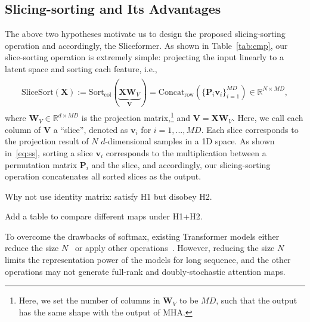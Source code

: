 \subsection{Slicing-sorting and Its Advantages}
The above two hypotheses motivate us to design the proposed slicing-sorting operation and accordingly, the Sliceformer. 
As shown in Table~\ref{tab:cmp}, our slice-sorting operation is extremely simple: projecting the input linearly to a latent space and sorting each feature, i.e.,
\begin{eqnarray}\label{eq:ss}
\begin{aligned}
    \text{SliceSort}(\bm{X}) := \text{Sort}_{\text{col}}(\underbrace{\bm{X}\bm{W}_V}_{\bm{V}}) = \text{Concat}_{\text{row}}(\{\bm{P}_i\bm{v}_i\}_{i=1}^{MD}) \in\mathbb{R}^{N\times MD},
\end{aligned}
\end{eqnarray}
where $\bm{W}_V\in\mathbb{R}^{d\times MD}$ is the projection matrix,\footnote{Here, we set the number of columns in $\bm{W}_V$ to be $MD$, such that the output has the same shape with the output of MHA.} and $\bm{V}=\bm{XW}_V$. 
Here, we call each column of $\bm{V}$ a ``slice'', denoted as $\bm{v}_i$ for $i=1,...,MD$. 
Each slice corresponds to the projection result of $N$ $d$-dimensional samples in a 1D space. 
As shown in~\eqref{eq:ss}, sorting a slice $\bm{v}_i$ corresponds to the multiplication between a permutation matrix $\bm{P}_i$ and the slice, and accordingly, our slicing-sorting operation concatenates all sorted slices as the output.  



Why not use identity matrix: satisfy H1 but disobey H2.

Add a table to compare different maps under H1+H2.


To overcome the drawbacks of softmax, existing Transformer models either reduce the size $N$~\cite{kitaev2020reformer,beltagy2020longformer,child2019generating} or apply other operations~\cite{tsai2019transformer,zhen2022cosformer}. 
However, reducing the size $N$ limits the representation power of the models for long sequence, and the other operations may not generate full-rank and doubly-stochastic attention maps.